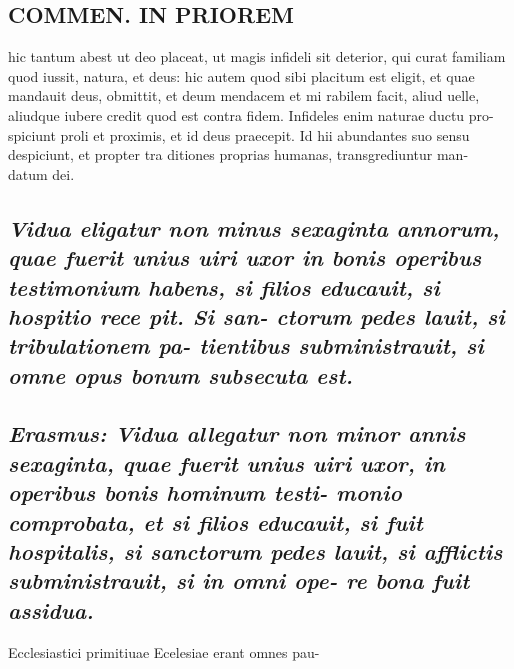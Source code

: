 \documentclass{article}
\begin{document}
\begin{pages}
\section*{COMMEN. IN PRIOREM }
\marginpar{[ p.122 ]}\pstart hic tantum abest ut deo placeat, ut magis infideli sit deterior, qui curat familiam quod iussit, natura, et deus: hic autem quod sibi placitum est eligit, et quae mandauit deus, obmittit, et deum mendacem et mi rabilem facit, aliud uelle, aliudque iubere credit quod est contra fidem. Infideles enim naturae ductu pro- spiciunt proli et proximis, et id deus praecepit. Id hii abundantes suo sensu despiciunt, et propter tra ditiones proprias humanas, transgrediuntur man- datum dei.  \pend
{}
{}
\subsection*{\textit{Vidua eligatur non minus sexaginta annorum, quae fuerit unius uiri uxor in bonis operibus testimonium habens, si filios educauit, si hospitio rece pit. Si san- ctorum pedes lauit, si tribulationem pa- tientibus subministrauit, si omne opus bonum subsecuta est. }}
{}
\subsection*{\textit{Erasmus: Vidua allegatur non minor annis sexaginta, quae fuerit unius uiri uxor, in operibus bonis hominum testi- monio comprobata, et si filios educauit, si fuit hospitalis, si sanctorum pedes lauit, si afflictis subministrauit, si in omni ope- re bona fuit assidua. }}\pstart Ecclesiastici primitiuae Ecelesiae erant omnes pau-  \pend

\end{pages}
\end{document}

